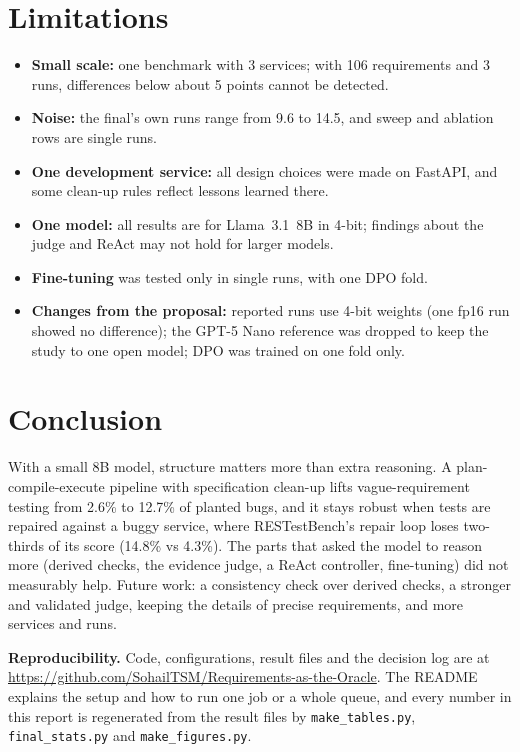 \documentclass[11pt,a4paper]{article}
\begin{document}
\section{Limitations}
\begin{itemize}
\item \textbf{Small scale:} one benchmark with 3 services; with 106 requirements and 3 runs, differences below about 5 points cannot be detected.
\item \textbf{Noise:} the final's own runs range from 9.6 to 14.5, and sweep and ablation rows are single runs.
\item \textbf{One development service:} all design choices were made on FastAPI, and some clean-up rules reflect lessons learned there.
\item \textbf{One model:} all results are for Llama~3.1~8B in 4-bit; findings about the judge and ReAct may not hold for larger models.
\item \textbf{Fine-tuning} was tested only in single runs, with one DPO fold.
\item \textbf{Changes from the proposal:} reported runs use 4-bit weights (one fp16 run showed no difference); the GPT-5 Nano reference was dropped to keep the study to one open model; DPO was trained on one fold only.
\end{itemize}

\section{Conclusion}
With a small 8B model, structure matters more than extra reasoning. A plan-compile-execute pipeline with specification clean-up lifts vague-requirement testing from 2.6\% to 12.7\% of planted bugs, and it stays robust when tests are repaired against a buggy service, where RESTestBench's repair loop loses two-thirds of its score (14.8\% vs 4.3\%). The parts that asked the model to reason more (derived checks, the evidence judge, a ReAct controller, fine-tuning) did not measurably help. Future work: a consistency check over derived checks, a stronger and validated judge, keeping the details of precise requirements, and more services and runs.

\textbf{Reproducibility.} Code, configurations, result files and the decision log are at \url{https://github.com/SohailTSM/Requirements-as-the-Oracle}. The README explains the setup and how to run one job or a whole queue, and every number in this report is regenerated from the result files by \texttt{make\_tables.py}, \texttt{final\_stats.py} and \texttt{make\_figures.py}.
\end{document}
